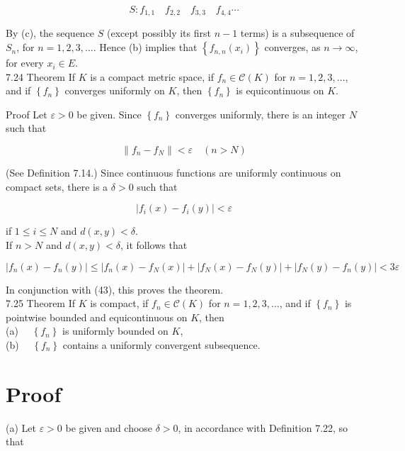 \documentclass[10pt]{article}
\begin{document}
$$
S: f_{1,1} \quad f_{2,2} \quad f_{3,3} \quad f_{4,4} \cdots
$$

By (c), the sequence $S$ (except possibly its first $n-1$ terms) is a subsequence of $S_{n}$, for $n=1,2,3, \ldots$. Hence (b) implies that $\left\{f_{n, n}\left(x_{i}\right)\right\}$ converges, as $n \rightarrow \infty$, for every $x_{i} \in E$.\\
7.24 Theorem If $K$ is a compact metric space, if $f_{n} \in \mathscr{C}(K)$ for $n=1,2,3, \ldots$, and if $\left\{f_{n}\right\}$ converges uniformly on $K$, then $\left\{f_{n}\right\}$ is equicontinuous on $K$.

Proof Let $\varepsilon>0$ be given. Since $\left\{f_{n}\right\}$ converges uniformly, there is an integer $N$ such that


\begin{equation*}
\left\|f_{n}-f_{N}\right\|<\varepsilon \quad(n>N) \tag{42}
\end{equation*}


(See Definition 7.14.) Since continuous functions are uniformly continuous on compact sets, there is a $\delta>0$ such that


\begin{equation*}
\left|f_{i}(x)-f_{i}(y)\right|<\varepsilon \tag{43}
\end{equation*}


if $1 \leq i \leq N$ and $d(x, y)<\delta$.\\
If $n>N$ and $d(x, y)<\delta$, it follows that

$$
\left|f_{n}(x)-f_{n}(y)\right| \leq\left|f_{n}(x)-f_{N}(x)\right|+\left|f_{N}(x)-f_{N}(y)\right|+\left|f_{N}(y)-f_{n}(y)\right|<3 \varepsilon
$$

In conjunction with (43), this proves the theorem.\\
7.25 Theorem If $K$ is compact, if $f_{n} \in \mathscr{C}(K)$ for $n=1,2,3, \ldots$, and if $\left\{f_{n}\right\}$ is pointwise bounded and equicontinuous on $K$, then\\
(a) $\quad\left\{f_{n}\right\}$ is uniformly bounded on $K$,\\
(b) $\quad\left\{f_{n}\right\}$ contains a uniformly convergent subsequence.

\section*{Proof}
(a) Let $\varepsilon>0$ be given and choose $\delta>0$, in accordance with Definition 7.22, so that
\end{document}
